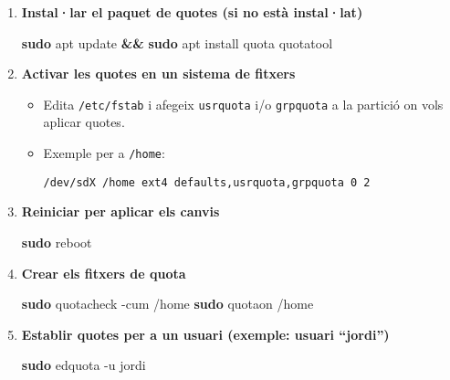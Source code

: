 \documentclass[
  12 pt,
  a4paper,
]{article}
\newenvironment{Shaded}{\begin{snugshade}}{\end{snugshade}}
\newcommand{\AttributeTok}[1]{\textcolor[rgb]{0.13,0.29,0.53}{#1}}
\newcommand{\FunctionTok}[1]{\textcolor[rgb]{0.13,0.29,0.53}{\textbf{#1}}}
\newcommand{\KeywordTok}[1]{\textcolor[rgb]{0.13,0.29,0.53}{\textbf{#1}}}
\newcommand{\NormalTok}[1]{#1}
\begin{document}
\begin{enumerate}
\def\labelenumi{\arabic{enumi}.}
\item
  \textbf{Instal·lar el paquet de quotes (si no està instal·lat)}

\begin{Shaded}
\begin{Highlighting}[]
\FunctionTok{sudo}\NormalTok{ apt update }\KeywordTok{\&\&} \FunctionTok{sudo}\NormalTok{ apt install quota quotatool}
\end{Highlighting}
\end{Shaded}
\item
  \textbf{Activar les quotes en un sistema de fitxers}

  \begin{itemize}
  \item
    Edita \texttt{/etc/fstab} i afegeix \texttt{usrquota} i/o
    \texttt{grpquota} a la partició on vols aplicar quotes.\\
  \item
    Exemple per a \texttt{/home}:

\begin{verbatim}
/dev/sdX /home ext4 defaults,usrquota,grpquota 0 2
\end{verbatim}
  \end{itemize}
\item
  \textbf{Reiniciar per aplicar els canvis}

\begin{Shaded}
\begin{Highlighting}[]
\FunctionTok{sudo}\NormalTok{ reboot}
\end{Highlighting}
\end{Shaded}
\item
  \textbf{Crear els fitxers de quota}

\begin{Shaded}
\begin{Highlighting}[]
\FunctionTok{sudo}\NormalTok{ quotacheck }\AttributeTok{{-}cum}\NormalTok{ /home}
\FunctionTok{sudo}\NormalTok{ quotaon /home}
\end{Highlighting}
\end{Shaded}
\item
  \textbf{Establir quotes per a un usuari (exemple: usuari ``jordi'')}

\begin{Shaded}
\begin{Highlighting}[]
\FunctionTok{sudo}\NormalTok{ edquota }\AttributeTok{{-}u}\NormalTok{ jordi}
\end{Highlighting}
\end{Shaded}


\end{enumerate}
\end{document}
